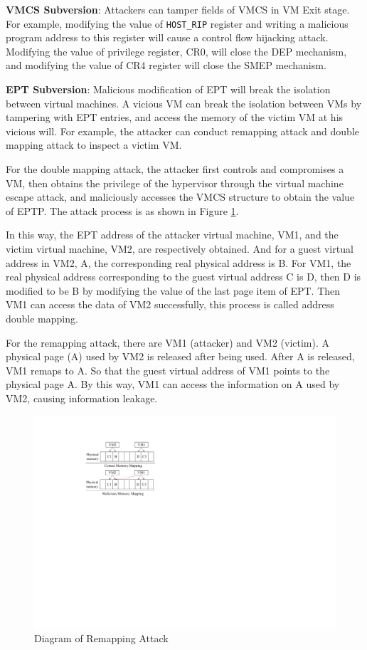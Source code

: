 \textbf{VMCS Subversion}:
Attackers can tamper fields of VMCS in VM Exit stage. For example, modifying the value of \verb|HOST_RIP| register and writing a malicious program address to this register will cause a control flow hijacking attack. Modifying the value of privilege register, CR0, will close the DEP mechanism, and modifying the value of CR4 register will close the SMEP mechanism.


\textbf{EPT Subversion}: 
Malicious modification of EPT will break the isolation between virtual machines. A vicious VM can break the isolation between VMs by tampering with EPT entries, and access the memory of the victim VM at his vicious will. For example, the attacker can conduct remapping attack and double mapping attack to inspect a victim VM. 

For the double mapping attack, the attacker first controls and compromises a VM, then obtains the privilege of the hypervisor through the virtual machine escape attack, and maliciously accesses the VMCS structure to obtain the value of EPTP. The attack process is as shown in Figure \ref{pic:remap}. 

In this way, the EPT address of the attacker virtual machine, VM1, and the victim virtual machine, VM2, are respectively obtained. And for a guest virtual address in VM2, A, the corresponding real physical address is B. For VM1, the real physical address corresponding to the guest virtual address C is D, then D is modified to be B by modifying the value of the last page item of EPT. Then VM1 can access the data of VM2 successfully, this process is called address double mapping.

For the remapping attack, there are VM1 (attacker) and VM2 (victim). A physical page (A) used by VM2 is released after being used. After A is released, VM1 remaps to A. So that the guest virtual address of VM1 points to the physical page A. By this way, VM1 can access the information on A used by VM2, causing information leakage.


\begin{figure}
    \centering
    \includegraphics[width=0.8\linewidth]{IMG/remap.pdf}
    \caption{Diagram of Remapping Attack}
    \label{pic:remap}
\end{figure}

